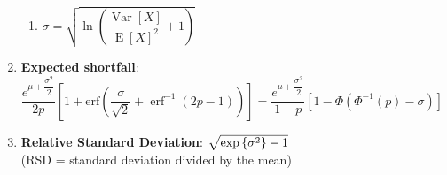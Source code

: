 \begin{enumerate}
\begin{enumerate}
        \item ${\displaystyle \sigma ={\sqrt {\ln \left({\dfrac {\operatorname {Var} [X]}{\operatorname {E} [X]^{2}}}+1\right)}}}$
        \hfill \cite{wiki/Log-normal_distribution}
    \end{enumerate}

    \item \textbf{Expected shortfall}:
    $
        {\displaystyle {{\dfrac {e^{\mu +{\dfrac {\sigma ^{2}}{2}}}}{2p}}\left[1+\text{erf} \left({\dfrac {\sigma }{\sqrt {2}}}+\operatorname {erf} ^{-1}(2p-1)\right)\right]
        ={\dfrac {e^{\mu +{\dfrac {\sigma ^{2}}{2}}}}{1-p}}\left[1-\Phi (\Phi ^{-1}(p)-\sigma )\right]}}
    $
    \hfill \cite{wiki/Log-normal_distribution}

    \item \textbf{Relative Standard Deviation}: $\sqrt{\exp\left\{\sigma^2\right\} - 1}$
    \hfill \cite{statistics/book/Statistics-for-Data-Scientists/Maurits-Kaptein}
    \\
    (RSD = standard deviation divided by the mean)
    \hfill \cite{statistics/book/Statistics-for-Data-Scientists/Maurits-Kaptein}
\end{enumerate}





